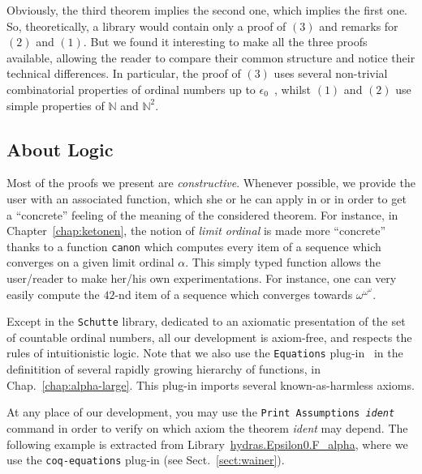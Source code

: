 \documentclass[a4paper]{book}
\begin{document}
Obviously, the third theorem implies the second one, which implies the first one. So, theoretically, a library would contain only a proof of $(3)$ and remarks for $(2)$ and $(1)$. But we found it interesting to make all the three proofs available, allowing the reader to compare their common structure and notice their technical differences.
In particular, the proof of $(3)$ uses several non-trivial combinatorial properties of ordinal numbers up to $\epsilon_0$~\cite{KS81}, whilst $(1)$ and $(2)$ use simple properties of $\mathbb{N}$ and $\mathbb{N}^2$.


\subsection{About Logic}

Most of the proofs we present are \emph{constructive}. Whenever possible, we provide the user with an associated function, which she or he can apply in \gallina{} or \ocaml{} in order to get a ``concrete'' feeling of the meaning of the considered theorem.
For instance, in Chapter~\vref{chap:ketonen}, the notion of \emph{limit ordinal} is
made more ``concrete'' thanks to a function \texttt{canon} which computes every item of a sequence which converges on a given limit ordinal $\alpha$. This simply typed function allows the user/reader to make her/his own experimentations.
For instance, one can very easily compute the $42$-nd item of a sequence which converges towards $\omega^{\omega^\omega}$.


 
Except in the \texttt{Schutte} library, dedicated to an axiomatic presentation of the set of countable ordinal numbers, all our development is axiom-free, and respects the rules of intuitionistic logic. Note that we also use the \texttt{Equations} plug-in~\cite{sozeau:hal-01671777} in the definitition of  several rapidly growing hierarchy of functions, in Chap.~\ref{chap:alpha-large}. This plug-in imports several known-as-harmless  axioms.



At any place of our development, you may use the  \texttt{Print Assumptions {\it ident}} command in order to verify on which axiom the theorem {\it ident} may depend. The following example is extracted from 
Library~\href{../theories/html/hydras.Epsilon0.F_alpha.html}{hydras.Epsilon0.F\_alpha}, where we use the \texttt{coq-equations} plug-in (see Sect.~\vref{sect:wainer}).
\end{document}
